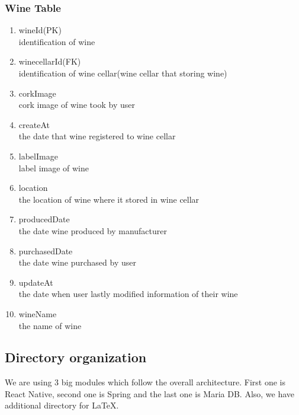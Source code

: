 \documentclass[sigconf, nonacm]{acmart}
\begin{document}
    \subsubsection{Wine Table}
     \begin{enumerate}
        \item wineId(PK)\\
        identification of wine
        \item winecellarId(FK)\\
        identification of wine cellar(wine cellar that storing wine)
        \item corkImage\\
        cork image of wine took by user
        \item createAt\\
        the date that wine registered to wine cellar
        \item labelImage\\
        label image of wine
        \item location\\
        the location of wine where it stored in wine cellar
        \item producedDate\\
        the date wine produced by manufacturer
        \item purchasedDate\\
        the date wine purchased by user
        \item updateAt\\ the date when user lastly modified information of their wine
        \item wineName\\ the name of wine
    \end{enumerate}

    \subsection{Directory organization}
    We are using 3 big modules which follow the overall architecture. First one is React Native, second one is Spring and the last one is Maria DB. Also, we have additional directory for LaTeX. 
\end{document}
